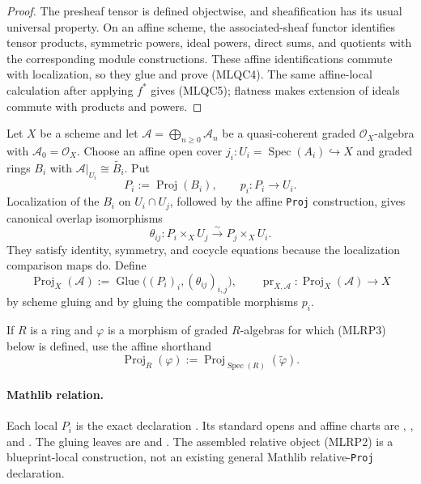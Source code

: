 \begin{proof}
  The presheaf tensor is defined objectwise, and sheafification has its usual
  universal property.  On an affine scheme, the associated-sheaf functor
  identifies tensor products, symmetric powers, ideal powers, direct sums,
  and quotients with the corresponding module constructions.  These affine
  identifications commute with localization, so they glue and prove (MLQC4).
  The same affine-local calculation after applying $f^*$ gives (MLQC5);
  flatness makes extension of ideals commute with products and powers.
\end{proof}

\begin{definition}
  \label{def:nagata-relative-proj}

  Let $X$ be a scheme and let
  $\mathcal A=\bigoplus_{n\geq0}\mathcal A_n$ be a quasi-coherent graded
  $\mathcal O_X$-algebra with $\mathcal A_0=\mathcal O_X$.  Choose an affine
  open cover $j_i\colon U_i=\operatorname{Spec}(A_i)\hookrightarrow X$ and
  graded rings $B_i$ with
  $\mathcal A|_{U_i}\cong\widetilde{B_i}$.  Put
  \[
    P_i:=\operatorname{Proj}(B_i),
    \qquad p_i\colon P_i\longrightarrow U_i.                    \tag{MLRP0}
  \]
  Localization of the $B_i$ on $U_i\cap U_j$, followed by the affine
  \texttt{Proj} construction, gives canonical overlap isomorphisms
  \[
    \theta_{ij}\colon
      P_i\times_XU_j\xrightarrow{\sim}P_j\times_XU_i.             \tag{MLRP1}
  \]
  They satisfy identity, symmetry, and cocycle equations because the
  localization comparison maps do.  Define
  \[
    \operatorname{Proj}_X(\mathcal A)
      :=\operatorname{Glue}\bigl((P_i)_i,(\theta_{ij})_{i,j}\bigr),
    \qquad
    \operatorname{pr}_{X,\mathcal A}\colon
      \operatorname{Proj}_X(\mathcal A)\longrightarrow X          \tag{MLRP2}
  \]
  by scheme gluing and by gluing the compatible morphisms $p_i$.

  If $R$ is a ring and $\varphi$ is a morphism of graded $R$-algebras for
  which (MLRP3) below is defined, use the affine shorthand
  \[
    \operatorname{Proj}_R(\varphi)
      :=\operatorname{Proj}_{\operatorname{Spec}(R)}
        (\widetilde\varphi).                                      \tag{MLRP2a}
  \]

  \paragraph{Mathlib relation.}
  Each local $P_i$ is the exact declaration
  \texttt{}.  Its standard opens and
  affine charts are \texttt{},
  \texttt{}, and
  \texttt{}.  The gluing leaves are
  \texttt{} and
  \texttt{}.  The assembled relative
  object (MLRP2) is a blueprint-local construction, not an existing general
  Mathlib relative-\texttt{Proj} declaration.
\end{definition}

